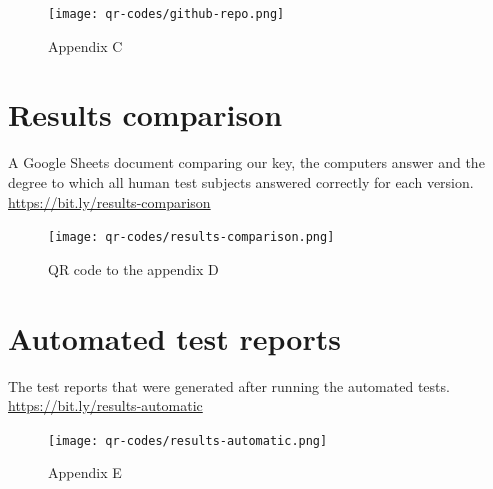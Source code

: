 \documentclass[journal,twocolumn]{IEEEtran}
\begin{document}
\begin{figure}[H]
    \centering
    \texttt{[image: qr-codes/github-repo.png]}
    \caption{Appendix C}
\end{figure}


\section{Results comparison}
A Google Sheets document comparing our key, the computers answer and the degree to which all human test subjects answered correctly for each version.
\href{https://bit.ly/results-comparison}{https://bit.ly/results-comparison}
\begin{figure}[h!]
    \centering
    \texttt{[image: qr-codes/results-comparison.png]}
    \caption{QR code to the appendix D}
\end{figure}

\section{Automated test reports}
The test reports that were generated after running the automated tests.
\href{https://bit.ly/results-automatic}{https://bit.ly/results-automatic}

\begin{figure}[H]
    \centering
    \texttt{[image: qr-codes/results-automatic.png]}
    \caption{Appendix E}
\end{figure}
\end{document}
